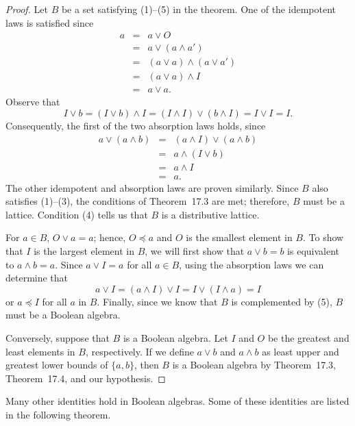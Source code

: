  
\begin{proof}
Let $B$ be a set satisfying (1)--(5) in the theorem.  One of the
idempotent laws is satisfied since
\begin{eqnarray*}
a & = & a \vee O \\
& = & a \vee (a \wedge a') \\
& = & (a \vee a) \wedge (a \vee a') \\
& = & (a \vee a ) \wedge I \\
& = & a \vee a.
\end{eqnarray*}
Observe that 
$$
I \vee b = (I \vee b ) \wedge I = (I \wedge I) \vee (b \wedge I) = I
\vee I =  I.  
$$
Consequently, the first of the two absorption laws holds, since
\begin{eqnarray*}
a \vee (a \wedge b) & = & (a \wedge I) \vee (a \wedge b) \\
& = & a \wedge (I \vee b) \\
& = & a  \wedge I \\
& = & a.
\end{eqnarray*}
The other idempotent and absorption laws are proven similarly. Since
$B$ also satisfies (1)--(3), the conditions of Theorem~17.3 are met;
therefore, $B$ must be a lattice.  Condition (4) tells us that $B$ is
a distributive lattice.
 
 
For $a \in B$, $O \vee a = a$; hence, $O \preceq a$ and $O$ is the
smallest element in $B$. To show that $I$ is the largest element in
$B$, we will first show that $a \vee b = b$ is equivalent to $a \wedge
b = a$.  Since $a \vee I = a$ for all $a \in B$, using the absorption
laws we can determine that
$$
a \vee I =(a \wedge I) \vee I = I \vee ( I \wedge a) = I
$$
or $a \preceq I$ for all $a$ in $B$. Finally, since we know that $B$
is complemented by (5), $B$ must be a Boolean algebra. 
 
 
Conversely, suppose that $B$ is a Boolean algebra. Let $I$ and $O$ be
the greatest and least elements in $B$, respectively.  If we define $a
\vee b$ and $a \wedge b$ as least upper and greatest lower bounds of
$\{ a, b\}$, then $B$ is a Boolean algebra by Theorem~17.3, 
Theorem~17.4, and our hypothesis. 
\end{proof}
 
 
\medskip
 
 
Many other identities hold in Boolean algebras.  Some of these
identities are listed in the following theorem. 
 
